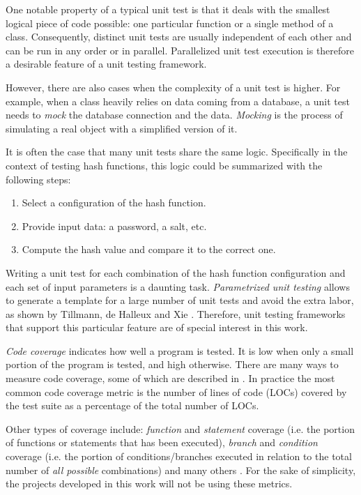 One notable property of a typical unit test is that it deals with the smallest logical piece of code possible: one particular function or a single method of a class. Consequently, distinct unit tests are usually independent of each other and can be run in any order or in parallel. Parallelized unit test execution is therefore a desirable feature of a unit testing framework.

However, there are also cases when the complexity of a unit test is higher. For example, when a class heavily relies on data coming from a database, a unit test needs to \emph{mock} the database connection and the data. \emph{Mocking} is the process of simulating a real object with a simplified version of it.

It is often the case that many unit tests share the same logic. Specifically in the context of testing hash functions, this logic could be summarized with the following steps:

\begin{enumerate}
    \item Select a configuration of the hash function.
    \item Provide input data: a password, a salt, etc.
    \item Compute the hash value and compare it to the correct one.
   \end{enumerate}

Writing a unit test for each combination of the hash function configuration and each set of input parameters is a daunting task. \emph{Parametrized unit testing} allows to generate a template for a large number of unit tests and avoid the extra labor, as shown by Tillmann, de Halleux and Xie \cite{tillmann:2010:parametrized-unit-tests-rock}. Therefore, unit testing frameworks that support this particular feature are of special interest in this work.

\emph{Code coverage} indicates how well a program is tested. It is low when only a small portion of the program is tested, and high otherwise. There are many ways to measure code coverage, some of which are described in \cite{elberzhager:2012:reducing-effort}. In practice the most common code coverage metric is the number of lines of code (LOCs) covered by the test suite as a percentage of the total number of LOCs.

Other types of coverage include: \emph{function} and \emph{statement} coverage (i.e. the portion of functions or statements that has been executed), \emph{branch} and \emph{condition} coverage (i.e. the portion of conditions/branches executed in relation to the total number of \emph{all possible} combinations) and many others \cite{Astels:2003:TDD:864016}. For the sake of simplicity, the projects developed in this work will not be using these metrics.

